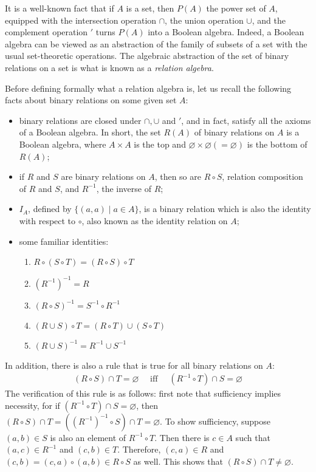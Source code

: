 \documentclass[12pt]{article}
\begin{document}
It is a well-known fact that if $A$ is a set, then $P(A)$ the power set of $A$, equipped with the intersection operation $\cap$, the union operation $\cup$, and the complement operation $'$ turns $P(A)$ into a Boolean algebra.  Indeed, a Boolean algebra can be viewed as an abstraction of the family of subsets of a set with the usual set-theoretic operations.  The algebraic abstraction of the set of binary relations on a set is what is known as a \emph{relation algebra}.

Before defining formally what a relation algebra is, let us recall the following facts about binary relations on some given set $A$:
\begin{itemize}
\item binary relations are closed under $\cap,\cup$ and $'$, and in fact, satisfy all the axioms of a Boolean algebra.  In short, the set $R(A)$ of binary relations on $A$ is a Boolean algebra, where $A\times A$ is the top and $\varnothing\times \varnothing (=\varnothing) $ is the bottom of $R(A)$;
\item if $R$ and $S$ are binary relations on $A$, then so are $R\circ S$, relation composition of $R$ and $S$, and $R^{-1}$, the inverse of $R$;
\item $I_A$, defined by $\lbrace (a,a)\mid a\in A\rbrace$, is a binary relation which is also the identity with respect to $\circ$, also known as the identity relation on $A$;
\item some familiar identities:
\begin{enumerate}
\item $R\circ (S\circ T) = (R\circ S)\circ T$
\item $(R^{-1})^{-1}=R$
\item $(R\circ S)^{-1} = S^{-1}\circ R^{-1}$
\item $(R\cup S)\circ T= (R\circ T)\cup (S\circ T)$
\item $(R\cup S)^{-1}=R^{-1}\cup S^{-1}$
\end{enumerate}
\end{itemize}

In addition, there is also a rule that is true for all binary relations on $A$: 
\begin{eqnarray}
(R\circ S)\cap T=\varnothing\quad \mbox{ iff } \quad (R^{-1}\circ T)\cap S = \varnothing
\end{eqnarray}
The verification of this rule is as follows: first note that sufficiency implies necessity, for if $(R^{-1}\circ T)\cap S = \varnothing$, then $(R\circ S)\cap T=((R^{-1})^{-1}\circ S)\cap T=\varnothing$.  To show sufficiency, suppose $(a,b)\in S$ is also an element of $R^{-1}\circ T$.  Then there is $c\in A$ such that $(a,c)\in R^{-1}$ and $(c,b)\in T$.  Therefore, $(c,a)\in R$ and $(c,b)=(c,a)\circ (a,b)\in R\circ S$ as well.  This shows that $(R\circ S)\cap T\ne \varnothing$.
\end{document}
